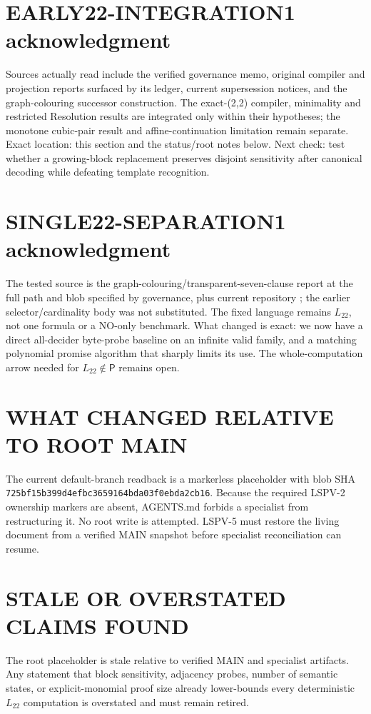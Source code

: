 \documentclass[11pt]{article}
\newcommand{\Ltwo}{L_{22}}
\begin{document}
\section{EARLY22-INTEGRATION1 acknowledgment}
Sources actually read include the verified governance memo, original compiler
and projection reports surfaced by its ledger, current supersession notices,
and the graph-colouring successor construction.  The exact-(2,2) compiler,
minimality and restricted Resolution results are integrated only within their
hypotheses; the monotone cubic-pair result and affine-continuation limitation
remain separate.  Exact location: this section and the status/root notes below.
Next check: test whether a growing-block replacement preserves disjoint
sensitivity after canonical decoding while defeating template recognition.

\section{SINGLE22-SEPARATION1 acknowledgment}
The tested source is the graph-colouring/transparent-seven-clause report at
the full path and blob specified by governance, plus current repository
; the earlier selector/cardinality body was not
substituted.  The fixed language remains $\Ltwo$, not one formula or a NO-only
benchmark.  What changed is exact: we now have a direct all-decider
byte-probe baseline on an infinite valid family, and a matching polynomial
promise algorithm that sharply limits its use.  The whole-computation arrow
needed for $\Ltwo\notin\mathsf P$ remains open.

\section{WHAT CHANGED RELATIVE TO ROOT MAIN}
The current default-branch  readback is a markerless placeholder
with blob SHA \texttt{725bf15b399d4efbc3659164bda03f0ebda2cb16}.
Because the required LSPV-2 ownership markers are absent, AGENTS.md forbids a
specialist from restructuring it.  No root write is attempted.  LSPV-5 must
restore the living document from a verified MAIN snapshot before specialist
reconciliation can resume.

\section{STALE OR OVERSTATED CLAIMS FOUND}
The root placeholder is stale relative to verified MAIN and specialist
artifacts.  Any statement that block sensitivity, adjacency probes, number of
semantic states, or explicit-monomial proof size already lower-bounds every
deterministic $\Ltwo$ computation is overstated and must remain retired.
\end{document}

